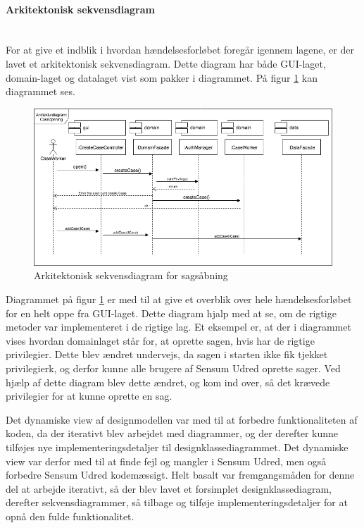 \documentclass[../../main.tex]{subfiles}
\begin{document}
\paragraph{Arkitektonisk sekvensdiagram}\mbox{} \\
For at give et indblik i hvordan hændelsesforløbet foregår igennem lagene, er der lavet et arkitektonisk sekvensdiagram. Dette diagram har både GUI-laget, domain-laget og datalaget vist som pakker i diagrammet. På figur \ref{fig:arkitektonisk} kan diagrammet ses.

\begin{figure}[H]
  \centering
  \includegraphics[scale=.42]{figurer/Sagsaabning.png}
  \caption{Arkitektonisk sekvensdiagram for sagsåbning}
  \label{fig:arkitektonisk}
\end{figure}

Diagrammet på figur \ref{fig:arkitektonisk} er med til at give et overblik over hele hændelsesforløbet for en  helt oppe fra GUI-laget. Dette diagram hjalp med at se, om de rigtige metoder var implementeret i de rigtige lag. Et eksempel er, at der i diagrammet vises hvordan domainlaget står for, at oprette sagen, hvis  har de rigtige privilegier. Dette blev ændret undervejs, da sagen i starten ikke fik tjekket privilegierk, og derfor kunne alle brugere af Sensum Udred oprette sager. Ved hjælp af dette diagram blev dette ændret, og  kom ind over, så det krævede privilegier for at kunne oprette en sag.

Det dynamiske view af designmodellen var med til at forbedre funktionaliteten af koden, da der iterativt blev arbejdet med diagrammer, og der derefter kunne tilføjes nye implementeringsdetaljer til designklassediagrammet. Det dynamiske view var derfor med til at finde fejl og mangler i Sensum Udred, men også forbedre Sensum Udred kodemæssigt. Helt basalt var fremgangsmåden for  denne del at arbejde iterativt, så der blev lavet et forsimplet designklassediagram, derefter sekvensdiagrammer, så tilbage og tilføje implementeringsdetaljer for at opnå den fulde funktionalitet.
\end{document}
